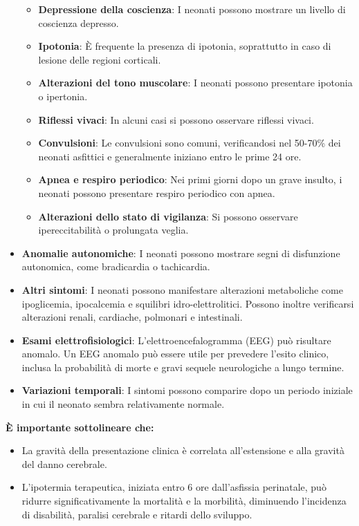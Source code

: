 \begin{itemize}
	\begin{itemize}
		\tightlist
		\item
		\textbf{Depressione della coscienza}: I neonati possono mostrare un livello di coscienza depresso.
		\item
		\textbf{Ipotonia}: È frequente la presenza di ipotonia, soprattutto in caso di lesione delle regioni corticali.
		\item
		\textbf{Alterazioni del tono muscolare}: I neonati possono presentare ipotonia o ipertonia.
		\item
		\textbf{Riflessi vivaci}: In alcuni casi si possono osservare riflessi vivaci.
		\item
		\textbf{Convulsioni}: Le convulsioni sono comuni, verificandosi nel 50-70\% dei neonati asfittici e generalmente iniziano entro le prime 24 ore.
		\item
		\textbf{Apnea e respiro periodico}: Nei primi giorni dopo un grave insulto, i neonati possono presentare respiro periodico con apnea.
		\item
		\textbf{Alterazioni dello stato di vigilanza}: Si possono osservare ipereccitabilità o prolungata veglia.
	\end{itemize}
	\item
	\textbf{Anomalie autonomiche}: I neonati possono mostrare segni di disfunzione autonomica, come bradicardia o tachicardia.
	\item
	\textbf{Altri sintomi}: I neonati possono manifestare alterazioni metaboliche come ipoglicemia, ipocalcemia e squilibri idro-elettrolitici. Possono inoltre verificarsi alterazioni renali, cardiache, polmonari e intestinali.
	\item
	\textbf{Esami elettrofisiologici}: L'elettroencefalogramma (EEG) può risultare anomalo. Un EEG anomalo può essere utile per prevedere l'esito clinico, inclusa la probabilità di morte e gravi sequele neurologiche a lungo termine.
	\item
	\textbf{Variazioni temporali}: I sintomi possono comparire dopo un periodo iniziale in cui il neonato sembra relativamente normale.
\end{itemize}

\textbf{È importante sottolineare che:}

\begin{itemize}
	\tightlist
	\item
	La gravità della presentazione clinica è correlata all'estensione e alla gravità del danno cerebrale.
	\item
	L'ipotermia terapeutica, iniziata entro 6 ore dall'asfissia perinatale, può ridurre significativamente la mortalità e la morbilità, diminuendo l'incidenza di disabilità, paralisi cerebrale e ritardi dello sviluppo.
\end{itemize}

